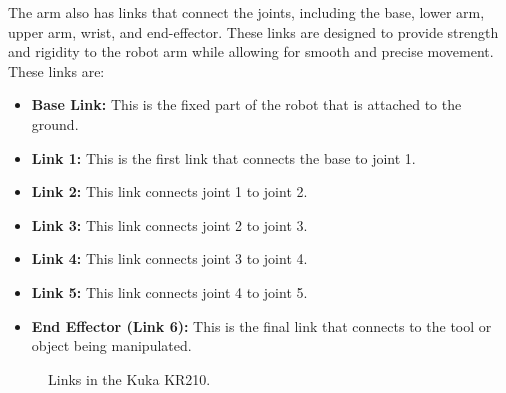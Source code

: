 \documentclass[12pt,oneside]{article}
\begin{document}
The arm also has links that connect the joints, including the base, lower arm, upper arm, wrist, and end-effector. These links are designed to provide strength and rigidity to the robot arm while allowing for smooth and precise movement. These links are:

\begin{itemize}
	\item \textbf{Base Link:} This is the fixed part of the robot that is attached to the ground.
	
	\item \textbf{Link 1:} This is the first link that connects the base to joint 1.
	
	\item \textbf{Link 2:} This link connects joint 1 to joint 2.
	
	\item \textbf{Link 3:} This link connects joint 2 to joint 3.
	
	\item \textbf{Link 4: }This link connects joint 3 to joint 4.
	
	\item \textbf{Link 5: }This link connects joint 4 to joint 5.
	
	\item \textbf{End Effector (Link 6):} This is the final link that connects to the tool or object being manipulated.
	
\end{itemize}


\begin{figure}[H]
  \centering
  \hfill
  \caption{Links in the Kuka KR210.}
\end{figure}
\end{document}
